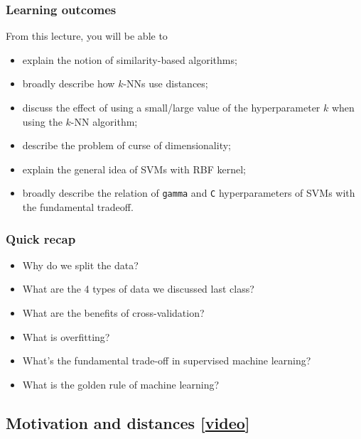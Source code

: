\documentclass[11pt]{article}
\providecommand{\tightlist}{%
      \setlength{\itemsep}{0pt}\setlength{\parskip}{0pt}}
\begin{document}
    

    \subsubsection{Learning outcomes}\label{learning-outcomes}

From this lecture, you will be able to

\begin{itemize}
\tightlist
\item
  explain the notion of similarity-based algorithms;
\item
  broadly describe how \(k\)-NNs use distances;
\item
  discuss the effect of using a small/large value of the hyperparameter
  \(k\) when using the \(k\)-NN algorithm;
\item
  describe the problem of curse of dimensionality;
\item
  explain the general idea of SVMs with RBF kernel;
\item
  broadly describe the relation of \texttt{gamma} and \texttt{C}
  hyperparameters of SVMs with the fundamental tradeoff.
\end{itemize}

    

    \subsubsection{Quick recap}\label{quick-recap}

\begin{itemize}
\tightlist
\item
  Why do we split the data?
\item
  What are the 4 types of data we discussed last class?
\item
  What are the benefits of cross-validation?
\item
  What is overfitting?
\item
  What's the fundamental trade-off in supervised machine learning?
\item
  What is the golden rule of machine learning?
\end{itemize}

    

    \subsection{\texorpdfstring{Motivation and distances
{[}\href{https://youtu.be/hCa3EXEUmQk}{video}{]}}{Motivation and distances {[}video{]}}}\label{motivation-and-distances-video}
\end{document}
